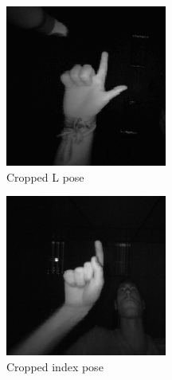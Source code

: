 \begin{figure}[!ht]
\centering
\begin{subfigure}{0.31\textwidth}
    \centering
    \includegraphics[width=.80\linewidth]{plotsAistats/L_147.png}
    \caption{Cropped L pose}
    \label{fig:cropped_L}
\end{subfigure}
\begin{subfigure}{0.31\textwidth}
    \centering
    \includegraphics[width=.80\linewidth]{plotsAistats/index_28.png}
    \caption{Cropped index pose}
    \label{fig:cropped_index}
\end{subfigure}
\begin{subfigure}{0.31\textwidth}

\end{subfigure}
\end{figure}
